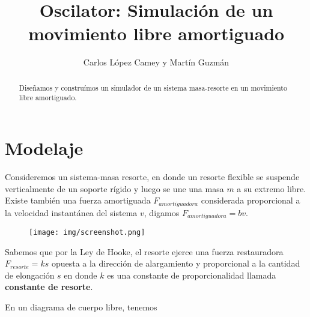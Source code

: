 \documentclass[11pt]{amsart}
\title{Oscilator: Simulaci\'{o}n de un movimiento libre amortiguado }
\author{Carlos L\'{o}pez Camey y Mart\'{i}n Guzm\'{a}n}
\begin{document}
\maketitle


\begin{abstract}

        Dise\~{n}amos y constru\'{i}mos un simulador de un sistema masa-resorte en un movimiento libre amortiguado.
\end{abstract}

\section{Modelaje}

Consideremos un sistema-masa resorte, en donde un resorte flexible se suspende verticalmente de un soporte r\'{i}gido y luego se une una masa $m$ a su extremo libre. Existe tambi\'{e}n una fuerza amortiguada $F_{amortiguadora}$ considerada proporcional a la velocidad instant\'{a}nea del sistema $v$, digamos $F_{amortiguadora} = bv$. \\

\begin{figure}[htp]
\texttt{[image: img/screenshot.png]}
\end{figure}

Sabemos que por la Ley de Hooke, el resorte ejerce una fuerza restauradora $F_{resorte} = ks$  opuesta a la direcci\'{o}n de alargamiento y proporcional a la cantidad de elongaci\'{o}n $s$ en donde $k$ es una constante de proporcionalidad llamada \textbf{constante de resorte}. 

En un diagrama de cuerpo libre, tenemos 

\begin{center}
\end{center}
\end{document}
